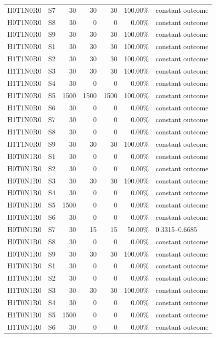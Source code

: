 \begin{tabular}{llrrrrl}
H0T1N0R0 & S7 & 30 & 30 & 30 & 100.00\% & constant outcome \\
H0T1N0R0 & S8 & 30 & 0 & 0 & 0.00\% & constant outcome \\
H0T1N0R0 & S9 & 30 & 30 & 30 & 100.00\% & constant outcome \\
H1T1N0R0 & S1 & 30 & 30 & 30 & 100.00\% & constant outcome \\
H1T1N0R0 & S2 & 30 & 30 & 30 & 100.00\% & constant outcome \\
H1T1N0R0 & S3 & 30 & 30 & 30 & 100.00\% & constant outcome \\
H1T1N0R0 & S4 & 30 & 0 & 0 & 0.00\% & constant outcome \\
H1T1N0R0 & S5 & 1500 & 1500 & 1500 & 100.00\% & constant outcome \\
H1T1N0R0 & S6 & 30 & 0 & 0 & 0.00\% & constant outcome \\
H1T1N0R0 & S7 & 30 & 0 & 0 & 0.00\% & constant outcome \\
H1T1N0R0 & S8 & 30 & 0 & 0 & 0.00\% & constant outcome \\
H1T1N0R0 & S9 & 30 & 30 & 30 & 100.00\% & constant outcome \\
H0T0N1R0 & S1 & 30 & 0 & 0 & 0.00\% & constant outcome \\
H0T0N1R0 & S2 & 30 & 0 & 0 & 0.00\% & constant outcome \\
H0T0N1R0 & S3 & 30 & 30 & 30 & 100.00\% & constant outcome \\
H0T0N1R0 & S4 & 30 & 0 & 0 & 0.00\% & constant outcome \\
H0T0N1R0 & S5 & 1500 & 0 & 0 & 0.00\% & constant outcome \\
H0T0N1R0 & S6 & 30 & 0 & 0 & 0.00\% & constant outcome \\
H0T0N1R0 & S7 & 30 & 15 & 15 & 50.00\% & 0.3315--0.6685 \\
H0T0N1R0 & S8 & 30 & 0 & 0 & 0.00\% & constant outcome \\
H0T0N1R0 & S9 & 30 & 30 & 30 & 100.00\% & constant outcome \\
H1T0N1R0 & S1 & 30 & 0 & 0 & 0.00\% & constant outcome \\
H1T0N1R0 & S2 & 30 & 0 & 0 & 0.00\% & constant outcome \\
H1T0N1R0 & S3 & 30 & 30 & 30 & 100.00\% & constant outcome \\
H1T0N1R0 & S4 & 30 & 0 & 0 & 0.00\% & constant outcome \\
H1T0N1R0 & S5 & 1500 & 0 & 0 & 0.00\% & constant outcome \\
H1T0N1R0 & S6 & 30 & 0 & 0 & 0.00\% & constant outcome \\

\end{tabular}
